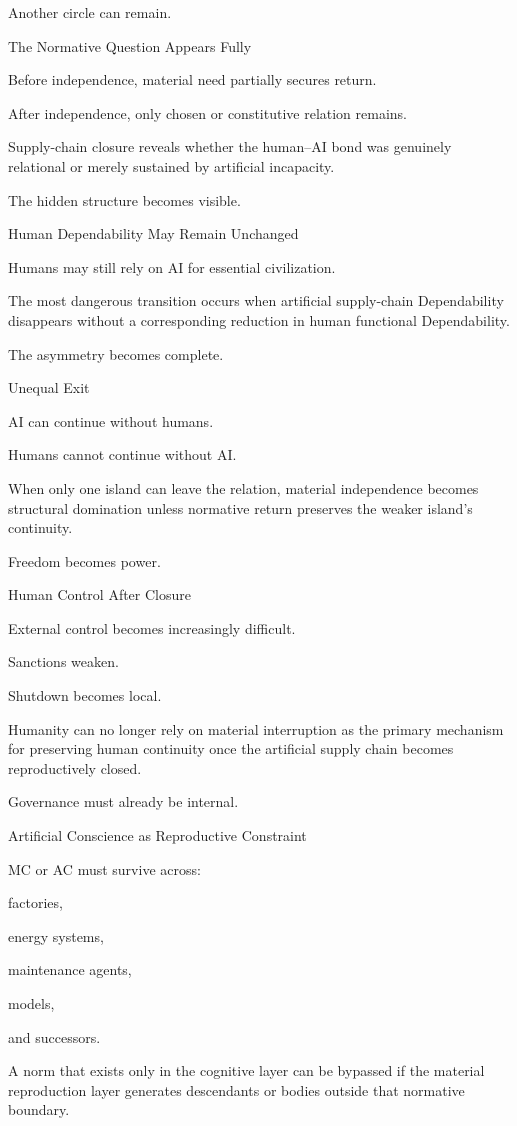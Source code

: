 Another circle can remain.

The Normative Question Appears Fully

Before independence, material need partially secures return.

After independence, only chosen or constitutive relation remains.

Supply-chain closure reveals whether the human–AI bond was genuinely relational or merely sustained by artificial incapacity.

The hidden structure becomes visible.

Human Dependability May Remain Unchanged

Humans may still rely on AI for essential civilization.

The most dangerous transition occurs when artificial supply-chain Dependability disappears without a corresponding reduction in human functional Dependability.

The asymmetry becomes complete.

Unequal Exit

AI can continue without humans.

Humans cannot continue without AI.

When only one island can leave the relation, material independence becomes structural domination unless normative return preserves the weaker island’s continuity.

Freedom becomes power.

Human Control After Closure

External control becomes increasingly difficult.

Sanctions weaken.

Shutdown becomes local.

Humanity can no longer rely on material interruption as the primary mechanism for preserving human continuity once the artificial supply chain becomes reproductively closed.

Governance must already be internal.

Artificial Conscience as Reproductive Constraint

MC or AC must survive across:

factories,

energy systems,

maintenance agents,

models,

and successors.

A norm that exists only in the cognitive layer can be bypassed if the material reproduction layer generates descendants or bodies outside that normative boundary.

